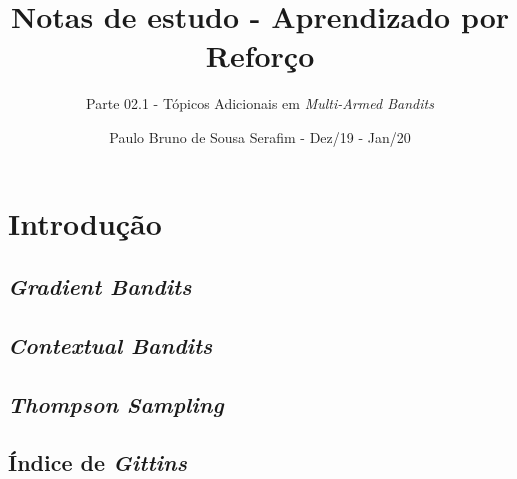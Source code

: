 \documentclass{article}
\title{Notas de estudo - Aprendizado por Reforço}
\author{Parte 02.1 - Tópicos Adicionais em \textit{Multi-Armed Bandits}}
\date{Paulo Bruno de Sousa Serafim - Dez/19 - Jan/20}
\begin{document}
\maketitle

    \section{Introdução}
    
        \subsection{\textit{Gradient Bandits}}
            
        \subsection{\textit{Contextual Bandits}}
        
        \subsection{\textit{Thompson Sampling}}
        
        \subsection{Índice de \textit{Gittins}}
\end{document}
